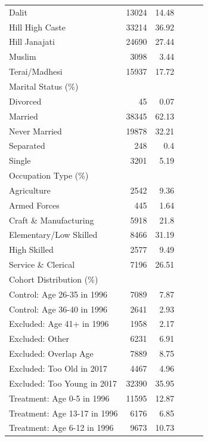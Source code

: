 \begin{table}[!h]
{\begin{tabular}[t]{lrrrrr}
Dalit & 13024 & 14.48 &  &  & \\
Hill High Caste & 33214 & 36.92 &  &  & \\
Hill Janajati & 24690 & 27.44 &  &  & \\
Muslim & 3098 & 3.44 &  &  & \\
\addlinespace
Terai/Madhesi & 15937 & 17.72 &  &  & \\
Marital Status (\%) &  &  &  &  & \\
Divorced & 45 & 0.07 &  &  & \\
Married & 38345 & 62.13 &  &  & \\
Never Married & 19878 & 32.21 &  &  & \\
\addlinespace
Separated & 248 & 0.4 &  &  & \\
Single & 3201 & 5.19 &  &  & \\
Occupation Type (\%) &  &  &  &  & \\
Agriculture & 2542 & 9.36 &  &  & \\
Armed Forces & 445 & 1.64 &  &  & \\
\addlinespace
Craft \& Manufacturing & 5918 & 21.8 &  &  & \\
Elementary/Low Skilled & 8466 & 31.19 &  &  & \\
High Skilled & 2577 & 9.49 &  &  & \\
Service \& Clerical & 7196 & 26.51 &  &  & \\
Cohort Distribution (\%) &  &  &  &  & \\
\addlinespace
Control: Age 26-35 in 1996 & 7089 & 7.87 &  &  & \\
Control: Age 36-40 in 1996 & 2641 & 2.93 &  &  & \\
Excluded: Age 41+ in 1996 & 1958 & 2.17 &  &  & \\
Excluded: Other & 6231 & 6.91 &  &  & \\
Excluded: Overlap Age & 7889 & 8.75 &  &  & \\
\addlinespace
Excluded: Too Old in 2017 & 4467 & 4.96 &  &  & \\
Excluded: Too Young in 2017 & 32390 & 35.95 &  &  & \\
Treatment: Age 0-5 in 1996 & 11595 & 12.87 &  &  & \\
Treatment: Age 13-17 in 1996 & 6176 & 6.85 &  &  & \\
Treatment: Age 6-12 in 1996 & 9673 & 10.73 &  &  & \\
\bottomrule
\end{tabular}}
\end{table}
